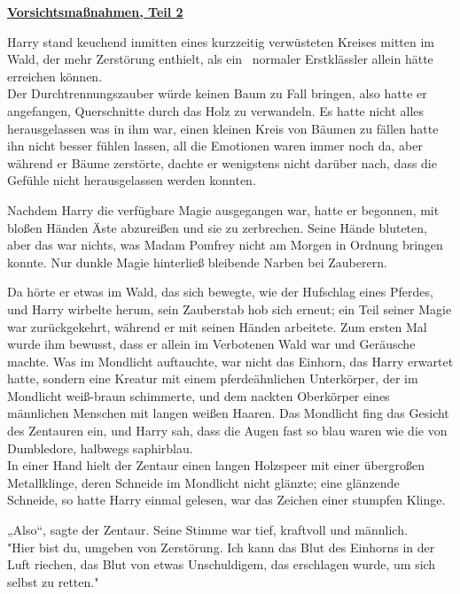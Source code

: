 

\hypertarget{vorsichtsmauxdfnahmen-teil-2}{%

\textbf{\uline{Vorsichtsmaßnahmen, Teil 2}}

Harry stand keuchend inmitten eines kurzzeitig verwüsteten Kreises mitten im Wald, der mehr Zerstörung enthielt, als ein ~normaler Erstklässler allein hätte erreichen können.\\ Der Durchtrennungszauber würde keinen Baum zu Fall bringen, also hatte er angefangen, Querschnitte durch das Holz zu verwandeln. Es hatte nicht alles herausgelassen was in ihm war, einen kleinen Kreis von Bäumen zu fällen hatte ihn nicht besser fühlen lassen, all die Emotionen waren immer noch da, aber während er Bäume zerstörte, dachte er wenigstens nicht darüber nach, dass die Gefühle nicht herausgelassen werden konnten.

Nachdem Harry die verfügbare Magie ausgegangen war, hatte er begonnen, mit bloßen Händen Äste abzureißen und sie zu zerbrechen. Seine Hände bluteten, aber das war nichts, was Madam Pomfrey nicht am Morgen in Ordnung bringen konnte. Nur dunkle Magie hinterließ bleibende Narben bei Zauberern.

Da hörte er etwas im Wald, das sich bewegte, wie der Hufschlag eines Pferdes, und Harry wirbelte herum, sein Zauberstab hob sich erneut; ein Teil seiner Magie war zurückgekehrt, während er mit seinen Händen arbeitete. Zum ersten Mal wurde ihm bewusst, dass er allein im Verbotenen Wald war und Geräusche machte. Was im Mondlicht auftauchte, war nicht das Einhorn, das Harry erwartet hatte, sondern eine Kreatur mit einem pferdeähnlichen Unterkörper, der im Mondlicht weiß-braun schimmerte, und dem nackten Oberkörper eines männlichen Menschen mit langen weißen Haaren. Das Mondlicht fing das Gesicht des Zentauren ein, und Harry sah, dass die Augen fast so blau waren wie die von Dumbledore, halbwegs saphirblau.\\ In einer Hand hielt der Zentaur einen langen Holzspeer mit einer übergroßen Metallklinge, deren Schneide im Mondlicht nicht glänzte; eine glänzende Schneide, so hatte Harry einmal gelesen, war das Zeichen einer stumpfen Klinge.

„Also“, sagte der Zentaur. Seine Stimme war tief, kraftvoll und männlich.\\ "Hier bist du, umgeben von Zerstörung. Ich kann das Blut des Einhorns in der Luft riechen, das Blut von etwas Unschuldigem, das erschlagen wurde, um sich selbst zu retten."

}
